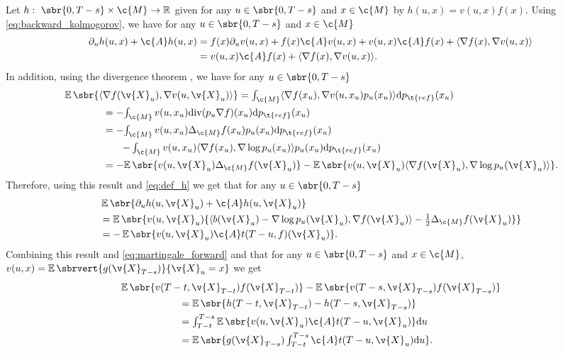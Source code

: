 Let $h: \ \sbr{0,T-s} \times \c{M} \to \R$ given for any $u \in \sbr{0,T-s}$ and $x \in \c{M}$ by $h(u,x) = v(u,x) f(x)$.
Using \eqref{eq:backward_kolmogorov}, we have for any $u \in \sbr{0,T-s}$ and $x \in \c{M}$ \begin{align} \partial_u h(u,x) + \c{A} h(u, x) & = f(x) \partial_u v(u,x) + f(x) \c{A} v(u,x) + v(u,x) \c{A} f(x) + \langle \nabla f(x), \nabla v(u,x)\rangle \\  & = v(u,x) \c{A} f(x) + \langle \nabla f(x), \nabla v(u,x)\rangle .
                 \label{eq:def_h}
\end{align}
In addition, using the divergence theorem \parencite[see][p.51]{lee2018introduction}, we have for any $u \in \sbr{0,T-s}$ \begin{align}  & \E\sbr{\langle \nabla f(\v{X}_u), \nabla v(u,\v{X}_u)\rangle} = \textstyle{\int_{\c{M}} \langle \nabla f(x_u), \nabla v(u,x_u) p_u(x_u) \rangle \mathrm{d} p_{\t{ref}}(x_u) } \\ & \qquad \qquad = - \textstyle{\int_{\c{M}} v(u,x_u) \mathrm{div}(p_u \nabla f) (x_u) \mathrm{d} p_{\t{ref}}(x_u) } \\ & \qquad \qquad = - \textstyle{\int_{\c{M}} v(u,x_u) \Delta_\c{M} f(x_u) p_u(x_u) \mathrm{d} p_{\t{ref}}(x_u)} \\ & \qquad \qquad \qquad \textstyle{- \int_{\c{M}} v(u,x_u) \langle \nabla f(x_u), \nabla \log p_u(x_u) \rangle p_u(x_u) \mathrm{d} p_{\t{ref}}(x_u) } \\ & \qquad \qquad = - \textstyle{\E\sbr{ v(u,\v{X}_u) \Delta_\c{M} f(\v{X}_u)} - \E\sbr{ v(u,\v{X}_u) \langle \nabla f(\v{X}_u), \nabla \log p_u(\v{X}_u) \rangle} } .
\end{align}
Therefore, using this result and \eqref{eq:def_h} we get that for any $u \in \sbr{0,T-s}$ \begin{align}  & \E\sbr{\partial_u h(u,\v{X}_u) + \c{A} h(u, \v{X}_u)} \\ &= \E\sbr{v(u,\v{X}_u)\{ \langle b(\v{X}_u) - \nabla \log p_u(\v{X}_u), \nabla f(\v{X}_u) \rangle -\tfrac{1}{2} \Delta_\c{M} f(\v{X}_u)\}} \\ &= -\E\sbr{v(u,\v{X}_u)\c{A}t(T-u,f)(\v{X}_u)} .
\end{align}
Combining this result and \eqref{eq:martingale_forward} and that for any $u \in \sbr{0,T-s}$ and $x \in \c{M}$, $v(u,x) = \E\sbrvert{g(\v{X}_{T-s})}{\v{X}_u=x}$ we get \begin{align}  & \E\sbr{v(T-t,\v{X}_{T-t})f(\v{X}_{T-t})} - \E\sbr{v(T-s,\v{X}_{T-s})f(\v{X}_{T-s})} \\ & \qquad \qquad \qquad = \E\sbr{h(T-t, \v{X}_{T-t}) - h(T-s, \v{X}_{T-s})} \\ & \qquad \qquad \qquad = \textstyle{\int_{T-t}^{T-s} \E\sbr{v(u,\v{X}_u)\c{A}t(T-u, \v{X}_u)} \mathrm{d} u } \\  & \qquad \qquad \qquad= \textstyle{\E\sbr{g(\v{X}_{T-s})\int_{T-t}^{T-s} \c{A}t(T-u, \v{X}_u) \mathrm{d} u } .
              }                                                                                      \\
\end{align}
